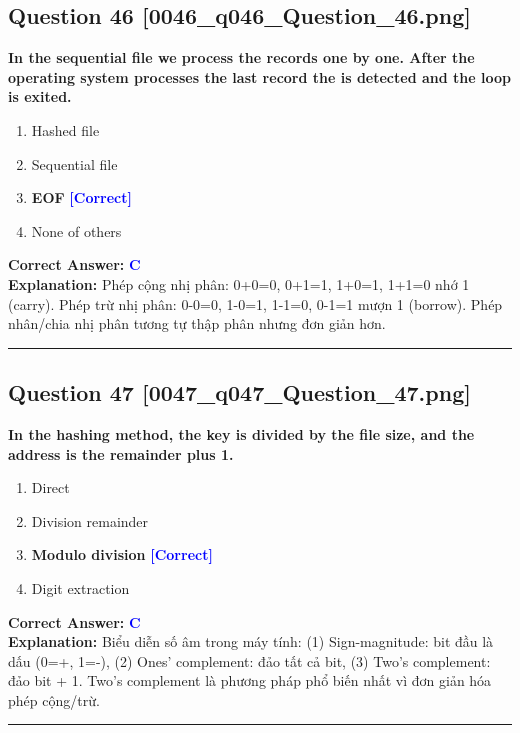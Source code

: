 \documentclass[11pt,a4paper]{article}
\begin{document}
\begin{minipage}{\textwidth}
\subsection*{Question 46 \quad \footnotesize{[0046\_q046\_Question\_46.png]}}
\noindent \textbf{In the sequential file we process the records one by one. After the operating system processes the last record the is detected and the loop is exited.}

\begin{enumerate}[label=\Alph*.]
    \item Hashed file
    \item Sequential file
    \item \textbf{EOF} \hfill \textcolor{blue}{\textbf{[Correct]}}
    \item None of others
\end{enumerate}

\noindent \textbf{Correct Answer:} \textcolor{blue}{\textbf{C}} \\[2pt]
\noindent \textbf{Explanation:} Phép cộng nhị phân: 0+0=0, 0+1=1, 1+0=1, 1+1=0 nhớ 1 (carry). Phép trừ nhị phân: 0-0=0, 1-0=1, 1-1=0, 0-1=1 mượn 1 (borrow). Phép nhân/chia nhị phân tương tự thập phân nhưng đơn giản hơn.

\par\vspace{0.3cm}
\hrule
\vspace{0.3cm}
\end{minipage}

\begin{minipage}{\textwidth}
\subsection*{Question 47 \quad \footnotesize{[0047\_q047\_Question\_47.png]}}
\noindent \textbf{In the hashing method, the key is divided by the file size, and the address is the remainder plus 1.}

\begin{enumerate}[label=\Alph*.]
    \item Direct
    \item Division remainder
    \item \textbf{Modulo division} \hfill \textcolor{blue}{\textbf{[Correct]}}
    \item Digit extraction
\end{enumerate}

\noindent \textbf{Correct Answer:} \textcolor{blue}{\textbf{C}} \\[2pt]
\noindent \textbf{Explanation:} Biểu diễn số âm trong máy tính: (1) Sign-magnitude: bit đầu là dấu (0=+, 1=-), (2) Ones' complement: đảo tất cả bit, (3) Two's complement: đảo bit + 1. Two's complement là phương pháp phổ biến nhất vì đơn giản hóa phép cộng/trừ.

\par\vspace{0.3cm}
\hrule
\vspace{0.3cm}
\end{minipage}
\end{document}

